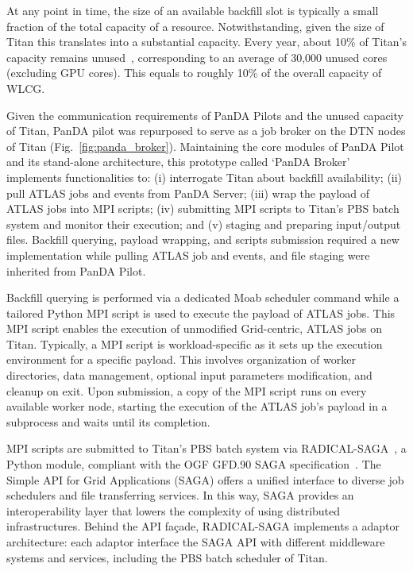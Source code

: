 At any point in time, the size of an available backfill slot is typically a
small fraction of the total capacity of a resource. Notwithstanding, given the
size of Titan this translates into a substantial capacity. Every year, about
10\% of Titan's capacity remains unused~\cite{barker2016us}, corresponding to an
average of 30,000 unused cores (excluding GPU cores). This equals to roughly
10\% of the overall capacity of WLCG.

Given the communication requirements of PanDA Pilots and the unused capacity of
Titan, PanDA pilot was repurposed to serve as a job broker on the DTN nodes of
Titan (Fig.~\ref{fig:panda_broker}). Maintaining the core modules of PanDA Pilot
and its stand-alone architecture, this prototype called `PanDA Broker'
implements functionalities to: (i) interrogate Titan about backfill
availability; (ii) pull ATLAS jobs and events from PanDA Server; (iii) wrap the
payload of ATLAS jobs into MPI scripts; (iv) submitting MPI scripts to Titan's
PBS batch system and monitor their execution; and (v) staging and preparing
input/output files. Backfill querying, payload wrapping, and scripts submission
required a new implementation while pulling ATLAS job and events, and file
staging were inherited from PanDA Pilot.

Backfill querying is performed via a dedicated Moab scheduler command while a
tailored Python MPI script is used to execute the payload of ATLAS jobs. This
MPI script enables the execution of unmodified Grid-centric, ATLAS jobs on
Titan. Typically, a MPI script is workload-specific as it sets up the execution
environment for a specific payload. This involves organization of worker
directories, data management, optional input parameters modification, and
cleanup on exit. Upon submission, a copy of the MPI script runs on every
available worker node, starting the execution of the ATLAS job's payload in a
subprocess and waits until its completion.

MPI scripts are submitted to Titan's PBS batch system via
RADICAL-SAGA~\cite{radical-saga_url}, a Python module, compliant with the OGF
GFD.90 SAGA specification~\cite{goodale2008simple}. The Simple API for Grid
Applications (SAGA) offers a unified interface to diverse job schedulers and
file transferring services. In this way, SAGA provides an interoperability layer
that lowers the complexity of using distributed infrastructures. Behind the API
façade, RADICAL-SAGA implements a adaptor architecture: each adaptor interface
the SAGA API with different middleware systems and services, including the PBS
batch scheduler of Titan.

